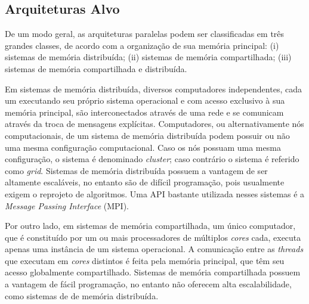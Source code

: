\documentclass{SBCbookchapter}
\begin{document}
	\subsection{Arquiteturas Alvo}

		De um modo geral, as arquiteturas paralelas podem ser
		classificadas em três grandes classes, de acordo com a
		organização de sua memória principal: (i) sistemas de memória
		distribuída; (ii) sistemas de memória compartilhada; (iii)
		sistemas de memória compartilhada e distribuída.
	
		Em sistemas de memória distribuída, diversos computadores
		independentes, cada um executando seu próprio sistema
		operacional e com acesso exclusivo à sua memória principal, são
		interconectados através de uma rede e se comunicam através da
		troca de mensagens explícitas. Computadores, ou alternativamente
		nós computacionais, de um sistema de memória distribuída podem
		possuir ou não uma mesma configuração computacional.  Caso os
		nós possuam uma mesma configuração, o sistema é denominado
		\textit{cluster}; caso contrário o sistema é referido como
		\textit{grid}. Sistemas de memória distribuída possuem a
		vantagem de ser altamente escaláveis, no entanto são de difícil
		programação, pois usualmente exigem o reprojeto de algoritmos.
		Uma API bastante utilizada nesses sistemas é a \textit{Message
		Passing Interface} (MPI).
		
		Por outro lado, em sistemas de memória compartilhada, um único
		computador, que é constituído por um ou mais processadores de
		múltiplos \textit{cores} cada, executa apenas uma instância de
		um sistema operacional. A comunicação entre as \textit{threads}
		que executam em \textit{cores} distintos é feita pela memória
		principal, que têm seu acesso globalmente compartilhado.
		Sistemas de memória compartilhada possuem a vantagem de fácil
		programação, no entanto não oferecem alta escalabilidade, como
		sistemas de de memória distribuída.
            
\end{document}
